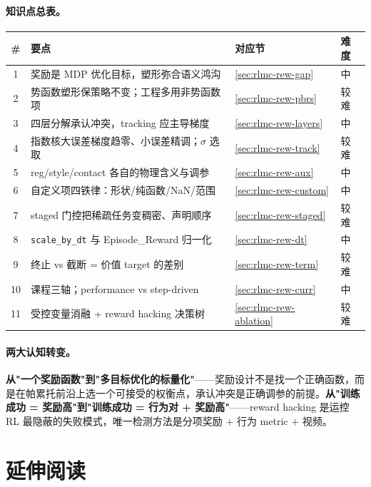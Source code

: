 \paragraph{知识点总表。}
\begin{center}
\small
\begin{tabular}{@{}clll@{}}
\toprule
\# & 要点 & 对应节 & 难度 \\
\midrule
1 & 奖励是 MDP 优化目标，塑形弥合语义鸿沟 & \cref{sec:rlmc-rew-gap} & 中 \\
2 & 势函数塑形保策略不变；工程多用非势函数项 & \cref{sec:rlmc-rew-pbrs} & 较难 \\
3 & 四层分解承认冲突，tracking 应主导梯度 & \cref{sec:rlmc-rew-layers} & 中 \\
4 & 指数核大误差梯度趋零、小误差精调；$\sigma$ 选取 & \cref{sec:rlmc-rew-track} & 较难 \\
5 & reg/style/contact 各自的物理含义与调参 & \cref{sec:rlmc-rew-aux} & 中 \\
6 & 自定义项四铁律：形状/纯函数/NaN/范围 & \cref{sec:rlmc-rew-custom} & 中 \\
7 & staged 门控把稀疏任务变稠密、声明顺序 & \cref{sec:rlmc-rew-staged} & 较难 \\
8 & \verb|scale_by_dt| 与 Episode\_Reward 归一化 & \cref{sec:rlmc-rew-dt} & 中 \\
9 & 终止 vs 截断 = 价值 target 的差别 & \cref{sec:rlmc-rew-term} & 较难 \\
10 & 课程三轴；performance vs step-driven & \cref{sec:rlmc-rew-curr} & 中 \\
11 & 受控变量消融 + reward hacking 决策树 & \cref{sec:rlmc-rew-ablation} & 较难 \\
\bottomrule
\end{tabular}
\end{center}

\paragraph{两大认知转变。} \textbf{从"一个奖励函数"到"多目标优化的标量化"}——奖励设计不是找一个正确函数，而是在帕累托前沿上选一个可接受的权衡点，承认冲突是正确调参的前提。\textbf{从"训练成功 = 奖励高"到"训练成功 = 行为对 + 奖励高"}——reward hacking 是运控 RL 最隐蔽的失败模式，唯一检测方法是分项奖励 $+$ 行为 metric $+$ 视频。

\section*{延伸阅读}
\label{sec:rlmc-rew-further}

